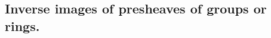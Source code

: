 \documentclass[../main.tex]{subfiles}
\begin{document}
\subsection{Inverse images of presheaves of groups or rings.}
\end{document}
